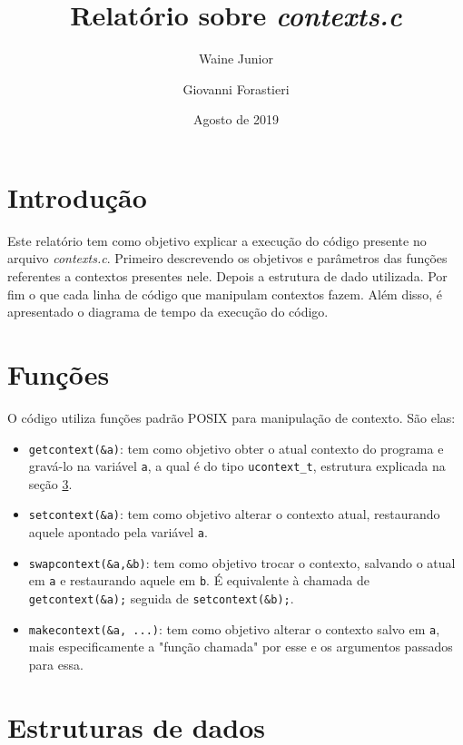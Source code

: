 \documentclass [12pt,oneside] {article}
\begin{document}
\title {Relatório sobre \emph{contexts.c}}
\author {Waine Junior \and Giovanni Forastieri}
\date {Agosto de 2019}
\maketitle


\section{Introdução}
Este relatório tem como objetivo explicar a execução do código presente no arquivo \emph{contexts.c}. Primeiro descrevendo os objetivos e parâmetros das funções referentes a contextos presentes nele. Depois a estrutura de dado utilizada. Por fim o que cada linha de código que manipulam contextos fazem. Além disso, é apresentado o diagrama de tempo da execução do código.

\section{Funções}

O código utiliza funções padrão POSIX para manipulação de contexto. São elas:
\begin{itemize}
	\item \texttt{getcontext(\&a)}: tem como objetivo obter o atual contexto do programa e gravá-lo na variável \texttt{a}, a qual é do tipo \texttt{ucontext\_t}, estrutura explicada na seção \ref{sec:estr_dados}.
	\item \texttt{setcontext(\&a)}: tem como objetivo alterar o contexto atual, restaurando aquele apontado pela variável \texttt{a}.
	\item \texttt{swapcontext(\&a,\&b)}: tem como objetivo trocar o contexto, salvando o atual em \texttt{a} e restaurando aquele em \texttt{b}. É equivalente à chamada de \texttt{getcontext(\&a);} seguida de
	\texttt{setcontext(\&b);}.
	\item \texttt{makecontext(\&a, ...)}: tem como objetivo alterar o contexto salvo em \texttt{a}, mais especificamente a "função chamada" por esse e os argumentos passados para essa.
\end{itemize}

\section{Estruturas de dados}\label{sec:estr_dados}
\end{document}
